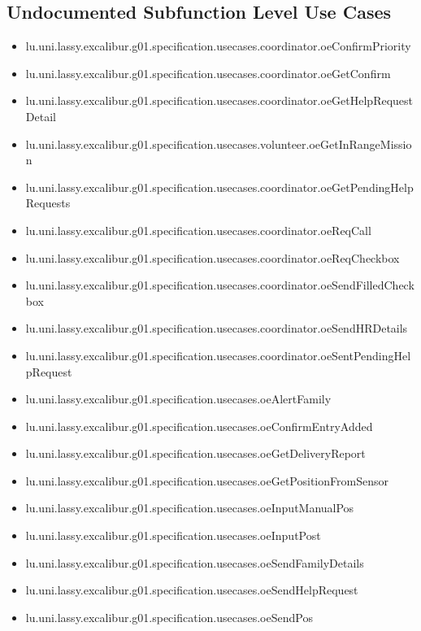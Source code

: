 \subsection[Undocumented Use Cases - Subfunction Level]{Undocumented Subfunction Level Use Cases}
\begin{itemize}
\item lu.uni.lassy.excalibur.g01.specification.usecases.coordinator.oeConfirmPriority 
\item lu.uni.lassy.excalibur.g01.specification.usecases.coordinator.oeGetConfirm 
\item lu.uni.lassy.excalibur.g01.specification.usecases.coordinator.oeGetHelpRequestDetail 
\item lu.uni.lassy.excalibur.g01.specification.usecases.volunteer.oeGetInRangeMission 
\item lu.uni.lassy.excalibur.g01.specification.usecases.coordinator.oeGetPendingHelpRequests 
\item lu.uni.lassy.excalibur.g01.specification.usecases.coordinator.oeReqCall 
\item lu.uni.lassy.excalibur.g01.specification.usecases.coordinator.oeReqCheckbox 
\item lu.uni.lassy.excalibur.g01.specification.usecases.coordinator.oeSendFilledCheckbox 
\item lu.uni.lassy.excalibur.g01.specification.usecases.coordinator.oeSendHRDetails 
\item lu.uni.lassy.excalibur.g01.specification.usecases.coordinator.oeSentPendingHelpRequest 
\item lu.uni.lassy.excalibur.g01.specification.usecases.oeAlertFamily 
\item lu.uni.lassy.excalibur.g01.specification.usecases.oeConfirmEntryAdded 
\item lu.uni.lassy.excalibur.g01.specification.usecases.oeGetDeliveryReport 
\item lu.uni.lassy.excalibur.g01.specification.usecases.oeGetPositionFromSensor 
\item lu.uni.lassy.excalibur.g01.specification.usecases.oeInputManualPos 
\item lu.uni.lassy.excalibur.g01.specification.usecases.oeInputPost 
\item lu.uni.lassy.excalibur.g01.specification.usecases.oeSendFamilyDetails 
\item lu.uni.lassy.excalibur.g01.specification.usecases.oeSendHelpRequest 
\item lu.uni.lassy.excalibur.g01.specification.usecases.oeSendPos 
\end{itemize}





